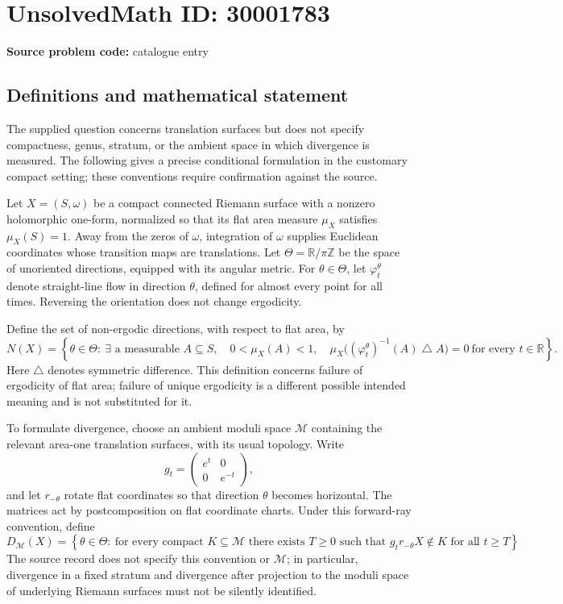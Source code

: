 \documentclass[11pt]{article}
\newcommand{\Z}{\mathbb{Z}}
\newcommand{\R}{\mathbb{R}}
\begin{document}
\section*{UnsolvedMath ID: 30001783}
\textbf{Source problem code:} catalogue entry
\subsection{Definitions and mathematical statement}
The supplied question concerns translation surfaces but does not specify compactness, genus, stratum, or the ambient space in which divergence is measured. The following gives a precise conditional formulation in the customary compact setting; these conventions require confirmation against the source.

Let \(X=(S,\omega)\) be a compact connected Riemann surface with a nonzero holomorphic one-form, normalized so that its flat area measure \(\mu_X\) satisfies \(\mu_X(S)=1\). Away from the zeros of \(\omega\), integration of \(\omega\) supplies Euclidean coordinates whose transition maps are translations. Let \(\Theta=\R/\pi\Z\) be the space of unoriented directions, equipped with its angular metric. For \(\theta\in\Theta\), let \(\varphi_t^\theta\) denote straight-line flow in direction \(\theta\), defined for almost every point for all times. Reversing the orientation does not change ergodicity.

Define the set of non-ergodic directions, with respect to flat area, by
\[
N(X)=\left\{\theta\in\Theta:\ \exists\text{ a measurable }A\subseteq S,\quad 0<\mu_X(A)<1,\quad \mu_X\bigl((\varphi_t^\theta)^{-1}(A)\mathbin{\triangle}A\bigr)=0\ \text{for every }t\in\R\right\}.
\]
Here \(\triangle\) denotes symmetric difference. This definition concerns failure of ergodicity of flat area; failure of unique ergodicity is a different possible intended meaning and is not substituted for it.

To formulate divergence, choose an ambient moduli space \(\mathcal M\) containing the relevant area-one translation surfaces, with its usual topology. Write
\[
g_t=\begin{pmatrix}e^t&0\\0&e^{-t}\end{pmatrix},
\]
and let \(r_{-\theta}\) rotate flat coordinates so that direction \(\theta\) becomes horizontal. The matrices act by postcomposition on flat coordinate charts. Under this forward-ray convention, define
\[
D_{\mathcal M}(X)=\left\{\theta\in\Theta:\ \text{for every compact }K\subseteq\mathcal M\text{ there exists }T\geq0\text{ such that }g_t r_{-\theta}X\notin K\text{ for all }t\geq T\right\}.
\]
The source record does not specify this convention or \(\mathcal M\); in particular, divergence in a fixed stratum and divergence after projection to the moduli space of underlying Riemann surfaces must not be silently identified.
\end{document}
